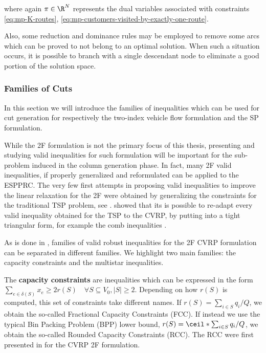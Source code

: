 where again $\pi \in \R^N$ represents the dual variables associated with constraints \eqref{eq:mp-K-routes}, \eqref{eq:mp-customers-visited-by-exactly-one-route}.

Also, some reduction and dominance rules may be employed to remove some arcs
which can be proved to not belong to an optimal solution.
When such a situation occurs, it is possible to branch with a single descendant node to eliminate
a good portion of the solution space.


\subsubsection{Families of Cuts}
\label{sec:families-of-cuts}

In this section we will introduce the families of inequalities
which can be used for cut generation for respectively
the two-index vehicle flow formulation
and the SP formulation.


While the 2F formulation is not the primary focus of this thesis,
presenting and studying valid inequalities for such formulation
will be important for the sub-problem induced in the column generation phase.
In fact, many 2F valid inequalities, if properly generalized and reformulated
can be applied to the ESPPRC.
The very few first attempts in proposing valid inequalities
to improve the linear relaxation for the 2F were obtained by
generalizing the constraints for the traditional TSP problem, see \textcite{naddef1993}.
\citeauthor{naddef1993} showed that its is possible to re-adapt
every valid inequality obtained for the TSP to the CVRP,
by putting into a tight triangular form,
for example the comb inequalities \parencite{chvatal1973,grotschel1979,augerat1995a}.

As is done in \textcite{toth2014},
families of valid robust inequalities for the 2F CVRP formulation
can be separated in different families.
We highlight two main families: the capacity constraints and the multistar inequalities.

The \textbf{capacity constraints} are inequalities which can be expressed in the form
$\sum_{e \in \delta(S)} x_e \ge 2 r(S) \quad \forall S \subseteq V_0, |S| \ge 2$.
Depending on how $r(S)$ is computed, this set of constraints take different names.
If $r(S) = \sum_{i \in S} q_i / Q$, we obtain the so-called Fractional Capacity Constraints (FCC).
If instead we use the typical Bin Packing Problem (BPP) lower bound, $r(S) = \ceil*{\sum_{i \in S} q_i / Q}$, we obtain the so-called Rounded Capacity Constraints (RCC).
The RCC were first presented in \textcite{laporte1983} for the CVRP 2F formulation.

